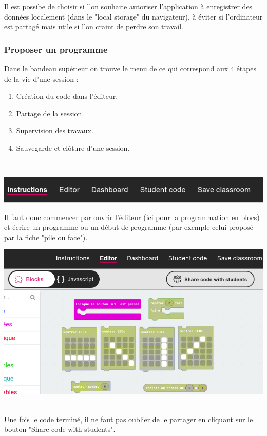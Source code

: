 \begin{remarque}
    Il est possibe de choisir si l'on souhaite autoriser l'application à enregistrer des données
     localement (dans le "local storage" du navigateur), à éviter si l'ordinateur est partagé 
     mais utile si l'on craint de perdre son travail.
\end{remarque}
\vspace{5mm}

\subsubsection{Proposer un programme}


\begin{methode}
    Dans le bandeau supérieur on trouve le menu de ce qui correspond aux 4 étapes
     de la vie d'une session :
     \begin{enumerate}
        \item Création du code dans l'éditeur.
        \item Partage de la session.
        \item Supervision des travaux.
        \item Sauvegarde et clôture d'une session.
     \end{enumerate}~\\

    \centerline{\includegraphics[width=0.8\linewidth]{res/classroom_menu.png}}
    
    Il faut donc commencer par ouvrir l'éditeur (ici pour la programmation en blocs) et écrire
    un programme ou un début de programme (par exemple celui proposé par la fiche "pile ou face").
    \vspace{5mm}

    \centerline{\includegraphics[width=0.6\linewidth]{res/classroom_editor.png}}~\\

    Une fois le code terminé, il ne faut pas oublier de le partager en cliquant sur le bouton
     "Share code with students".

\end{methode}


